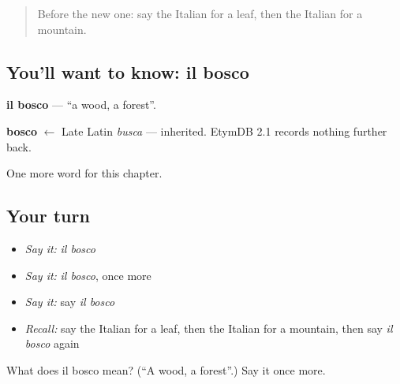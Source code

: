 \begin{quote}
Before the new one: say the Italian for a leaf, then the Italian for a mountain.
\end{quote}

\subsection*{You'll want to know: il bosco}
\textbf{il bosco} — \textquotedblleft{}a wood, a forest\textquotedblright{}.

\begin{cousinweb}
\textbf{bosco} $\leftarrow$ Late Latin \emph{busca} — inherited. EtymDB 2.1 records nothing further back.
\end{cousinweb}

\begin{grammarlens}[title={What you've built}]
One more word for this chapter.
\end{grammarlens}

\subsection*{Your turn}
\begin{itemize}
\raggedright
  \item \emph{Say it:} \emph{il bosco}
  \item \emph{Say it:} \emph{il bosco}, once more
  \item \emph{Say it:} say \emph{il bosco}
  \item \emph{Recall:} say the Italian for a leaf, then the Italian for a mountain, then say \emph{il bosco} again
\end{itemize}

\begin{tcolorbox}[breakable,colback=teal!4,colframe=teal!35!black,title={Before you move on}]
What does il bosco mean? (\textquotedblleft{}A wood, a forest\textquotedblright{}.) Say it once more.
\end{tcolorbox}
